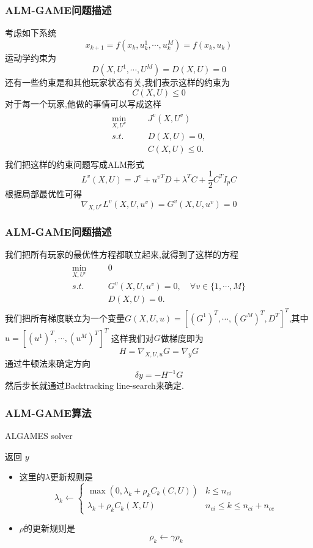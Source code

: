 \documentclass[UTF8, aspectratio=169, 9pt]{ctexbeamer}
\begin{document}
\begin{frame}
\frametitle{ALM-GAME问题描述}
考虑如下系统
$$
x_{k+1} = f (x_k, u^1_k, \cdots, u^M_k ) = f( x_k, u_k )
$$
运动学约束为
$$
D(X,U^1,\cdots,U^M) = D(X,U) = 0
$$
还有一些约束是和其他玩家状态有关,我们表示这样的约束为
$$
C(X,U) \le 0
$$
对于每一个玩家,他做的事情可以写成这样
\begin{align*}
\begin{split}
   \min_{X, U^v} \quad & J^v (X, U^v) \\
    s.t. \qquad & D(X, U) = 0, \\
    & C(X, U) \le 0.
\end{split}
\end{align*}
我们把这样的约束问题写成ALM形式
$$
L^v(X,U) = J^v + {u^v}^T D + \lambda^T C + \frac{1}{2} C^T I_p C
$$
根据局部最优性可得
$$
\nabla_{X,U^v} L^v(X,U,u^v) = G^v(X,U,u^v)=0
$$
\end{frame}

\begin{frame}
\frametitle{ALM-GAME问题描述}
我们把所有玩家的最优性方程都联立起来,就得到了这样的方程
\begin{align*}
\begin{split}
   \min_{X, U^v} \quad & 0 \\
    s.t. \qquad & G^v(X,U,u^v)=0, \quad \forall v \in \{ 1,\cdots,M \} \\
    & D(X, U) = 0.
\end{split}
\end{align*}
我们把所有梯度联立为一个变量$G(X,U,u) = [ (G^1)^T,\cdots,(G^M)^T,D^T ]^T$,其中$u=[ (u^1)^T,\cdots, (u^M)^T ]^T$ 这样我们对$G$做梯度即为
$$
H = \nabla_{X,U,u} G = \nabla_y G
$$
通过牛顿法来确定方向
$$
\delta y = - H^{-1} G
$$
然后步长就通过Backtracking line-search来确定.
\end{frame}

\begin{frame}
\frametitle{ALM-GAME算法}
\begin{algorithm}[H]
\caption{ALGAMES solver}%
\LinesNumbered %

返回 $y$ \;

\end{algorithm}

\begin{itemize}
  \item 这里的$\lambda$更新规则是
  $$
  \lambda_k \leftarrow \left \{ 
  \begin{array}{ll}
    \max (0, \lambda_k + \rho_k C_k(C,U) ) & k \leq n_{ci}\\
    \lambda_k + \rho_k C_k(X,U) & n_{ci} \leq k \leq n_{ci} + n_{ce}
  \end{array} \right.
  $$
  \item $\rho$的更新规则是
  $$
  \rho_k \leftarrow  \gamma \rho_k
  $$
\end{itemize}

\end{frame}
\end{document}
